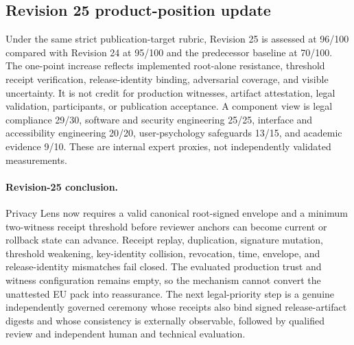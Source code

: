 

\subsection{Revision 25 product-position update}

Under the same strict publication-target rubric, Revision 25 is assessed at 96/100 compared with Revision 24 at 95/100 and the predecessor baseline at 70/100. The one-point increase reflects implemented root-alone resistance, threshold receipt verification, release-identity binding, adversarial coverage, and visible uncertainty. It is not credit for production witnesses, artifact attestation, legal validation, participants, or publication acceptance. A component view is legal compliance 29/30, software and security engineering 25/25, interface and accessibility engineering 20/20, user-psychology safeguards 13/15, and academic evidence 9/10. These are internal expert proxies, not independently validated measurements.

\paragraph{Revision-25 conclusion.} Privacy Lens now requires a valid canonical root-signed envelope and a minimum two-witness receipt threshold before reviewer anchors can become current or rollback state can advance. Receipt replay, duplication, signature mutation, threshold weakening, key-identity collision, revocation, time, envelope, and release-identity mismatches fail closed. The evaluated production trust and witness configuration remains empty, so the mechanism cannot convert the unattested EU pack into reassurance. The next legal-priority step is a genuine independently governed ceremony whose receipts also bind signed release-artifact digests and whose consistency is externally observable, followed by qualified review and independent human and technical evaluation.
